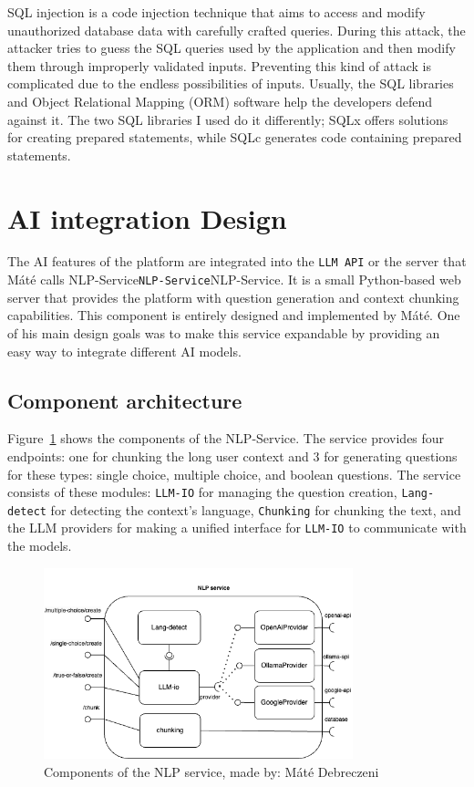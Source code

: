 SQL injection is a code injection technique that aims to access and modify unauthorized database data with carefully crafted queries. During this attack, the attacker tries to guess the SQL queries used by the application and then modify them through improperly validated inputs. Preventing this kind of attack is complicated due to the endless possibilities of inputs. Usually, the SQL libraries and Object Relational Mapping (ORM) software help the developers defend against it. The two SQL libraries I used do it differently; SQLx offers solutions for creating prepared statements, while SQLc generates code containing prepared statements.

\section{AI integration Design}

The AI features of the platform are integrated into the \texttt{LLM API} or the server that Máté calls NLP-Service\texttt{NLP-Service}NLP-Service. It is a small Python-based web server that provides the platform with question generation and context chunking capabilities. This component is entirely designed and implemented by Máté. One of his main design goals was to make this service expandable by providing an easy way to integrate different AI models.

\subsection{Component architecture}

Figure~\ref{fig:nlp-service-component} shows the components of the NLP-Service. The service provides four endpoints: one for chunking the long user context and 3 for generating questions for these types: single choice, multiple choice, and boolean questions. The service consists of these modules: \texttt{LLM-IO} for managing the question creation, \texttt{Lang-detect} for detecting the context's language, \texttt{Chunking} for chunking the text, and the LLM providers for making a unified interface for \texttt{LLM-IO} to communicate with the models.

\begin{figure}[H]
    \centering
    \includegraphics[width=0.8\textwidth, keepaspectratio]{figures/nlp-service-component.png}
    \caption{Components of the NLP service, made by: Máté Debreczeni}
    \label{fig:nlp-service-component}
\end{figure}

